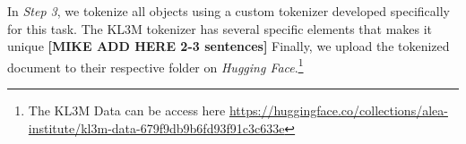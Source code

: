 In \textit{Step 3}, we tokenize all objects using a custom tokenizer developed specifically for this task.  The KL3M tokenizer has several specific elements that makes it unique \color{red}\textbf{[MIKE ADD HERE 2-3 sentences]} \color{black}  Finally, we upload the tokenized document to their respective folder on \textit{Hugging Face}.\footnote{The KL3M Data can be access here \url{https://huggingface.co/collections/alea-institute/kl3m-data-679f9db9b6fd93f91c3c633e}}

